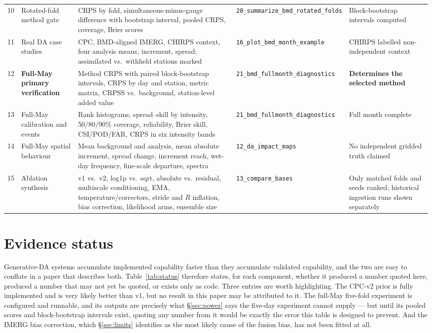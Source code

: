 \documentclass[10pt,twocolumn]{article}
\newcommand{\us}{\_\allowbreak}
\newcommand{\scr}[1]{\texttt{\footnotesize #1}}
\begin{document}
\begin{table}[!ht]
\begin{tabular}{L{0.025\textwidth}L{0.205\textwidth}L{0.335\textwidth}L{0.145\textwidth}L{0.205\textwidth}}
10 & Rotated-fold method gate & CRPS by fold, simultaneous-minus-gauge difference with bootstrap interval, pooled CRPS, coverage, Brier scores & \scr{20\us summarize\us bmd\us rotated\us folds} & Block-bootstrap intervals computed \\
11 & Real DA case studies & CPC, BMD-aligned IMERG, CHIRPS context, four analysis means, increment, spread; assimilated vs.\ withheld stations marked & \scr{16\us plot\us bmd\us month\us example} & CHIRPS labelled non-independent context \\
12 & \textbf{Full-May primary verification} & Method CRPS with paired block-bootstrap intervals, CRPS by day and station, metric matrix, CRPSS vs.\ background, station-level added value & \scr{21\us bmd\us fullmonth\us diagnostics} & \textbf{Determines the selected method} \\
13 & Full-May calibration and events & Rank histograms, spread--skill by intensity, 50/80/90\% coverage, reliability, Brier skill, CSI/POD/FAR, CRPS in six intensity bands & \scr{21\us bmd\us fullmonth\us diagnostics} & Full month complete \\
14 & Full-May spatial behaviour & Mean background and analysis, mean absolute increment, spread change, increment reach, wet-day frequency, fine-scale departure, spectra & \scr{12\us da\us impact\us maps} & No independent gridded truth claimed \\
15 & Ablation synthesis & v1 vs.\ v2, log1p vs.\ sqrt, absolute vs.\ residual, multiscale conditioning, EMA, temperature/correctors, stride and $R$ inflation, bias correction, likelihood arms, ensemble size & \scr{13\us compare\us bases} & Only matched folds and seeds ranked; historical ingestion runs shown separately \\
\bottomrule
\end{tabular}
\end{table}

\section{Evidence status}

Generative-DA systems accumulate implemented capability faster than they
accumulate validated capability, and the two are easy to conflate in a paper
that describes both. Table~\ref{tab:status} therefore states, for each
component, whether it produced a number quoted here, produced a number that may
not yet be quoted, or exists only as code. Three entries are worth
highlighting. The CPC-v2 prior is fully implemented and is very likely better
than v1, but no result in this paper may be attributed to it. The full-May
five-fold experiment is configured and runnable, and its outputs are precisely
what \S\ref{sec:power} says the five-day experiment cannot supply --- but until
its pooled scores and block-bootstrap intervals exist, quoting any number from
it would be exactly the error this table is designed to prevent. And the IMERG
bias correction, which \S\ref{sec:limits} identifies as the most likely cause
of the fusion bias, has not been fitted at all.
\end{document}
